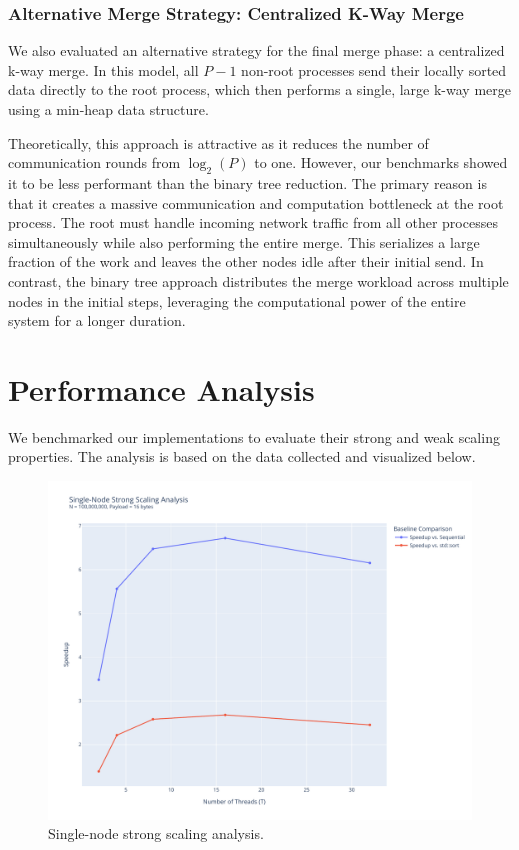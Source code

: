 \documentclass[10pt]{article}
\begin{document}
\subsubsection{Alternative Merge Strategy: Centralized K-Way Merge}
We also evaluated an alternative strategy for the final merge phase: a centralized k-way merge. In this model, all $P-1$ non-root processes send their locally sorted data directly to the root process, which then performs a single, large k-way merge using a min-heap data structure.

Theoretically, this approach is attractive as it reduces the number of communication rounds from $\log_2(P)$ to one. However, our benchmarks showed it to be less performant than the binary tree reduction. The primary reason is that it creates a massive communication and computation bottleneck at the root process. The root must handle incoming network traffic from all other processes simultaneously while also performing the entire merge. This serializes a large fraction of the work and leaves the other nodes idle after their initial send. In contrast, the binary tree approach distributes the merge workload across multiple nodes in the initial steps, leveraging the computational power of the entire system for a longer duration.

\clearpage
\section{Performance Analysis}
We benchmarked our implementations to evaluate their strong and weak scaling properties. The analysis is based on the data collected and visualized below.

\begin{figure}[H]
    \centering
    \includegraphics[width=0.6\linewidth]{../python/plots/strong_scaling.pdf}
    \caption{Single-node strong scaling analysis.}
    \label{fig:strong_scaling}
\end{figure}
\end{document}
